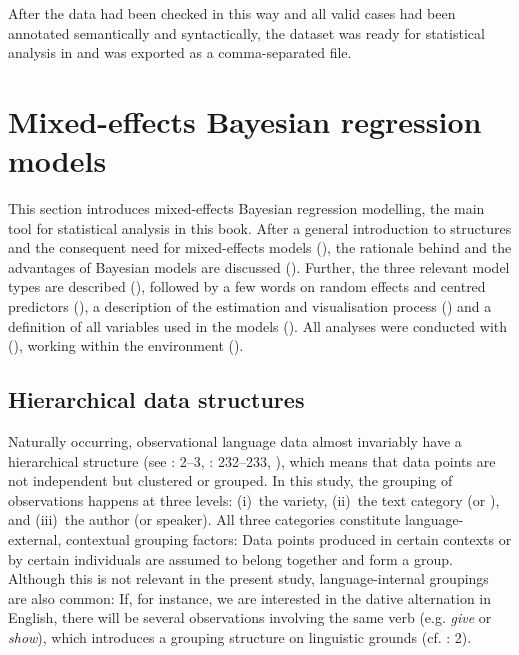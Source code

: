 After the data had been checked in this way and all valid cases had been annotated semantically and syntactically, the dataset was ready for statistical analysis in  and was exported as a comma-separated file.

\section{\label{bkm:Ref37060331}Mixed-effects Bayesian regression models}\label{sec:6.3}\largerpage


This section introduces mixed-effects Bayesian regression modelling, the main tool for statistical analysis in this book. After a general introduction to  structures and the consequent need for mixed-effects models (), the rationale behind and the advantages of Bayesian models are discussed (). Further, the three relevant model types are described (), followed by a few words on random effects and centred predictors (), a description of the estimation and visualisation process () and a definition of all variables used in the models (). All analyses were conducted with  (\citealt{RDevelopmentCoreTeam2021}), working within the  environment (\citealt{RStudioTeam2009}).

\subsection{\label{bkm:Ref38459565}Hierarchical data structures}\label{sec:6.3.1}\largerpage

Naturally occurring, observational language data almost invariably have a hierarchical structure (see \citealt{Johnson2014,SpeelmanHeylenGeeraerts2018}: 2–3, \citealt{Winter2020}: 232–233, \citealt{WinterGrice2021}), which means that data points are not independent but clustered or grouped. In this study, the grouping of observations happens at three levels:
(i)~the variety,
(ii)~the text category (or ), and
(iii)~the author (or speaker). All three categories constitute language-external, contextual grouping factors: Data points produced in certain contexts or by certain individuals are assumed to belong together and form a group. Although this is not relevant in the present study, language-internal groupings are also common: If, for instance, we are interested in the dative alternation in English, there will be several observations involving the same verb (e.g. \textit{give} or \textit{show}), which introduces a grouping structure on linguistic grounds (cf. \citealt{SpeelmanHeylenGeeraerts2018}: 2).

